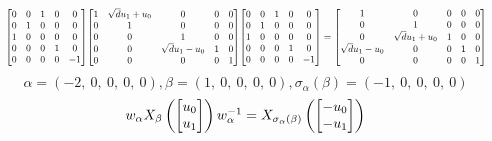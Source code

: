 \documentclass[11pt]{article}
\theoremstyle{definition}
\begin{document}
\[
\scaletoalign{\textwidth}{{\left[\begin{matrix}0 & 0 & 1 & 0 & 0\\0 & 1 & 0 & 0 & 0\\1 & 0 & 0 & 0 & 0\\0 & 0 & 0 & 1 & 0\\0 & 0 & 0 & 0 & -1\end{matrix}\right]} {\left[\begin{matrix}1 & \sqrt{d} u_{1} + u_{0} & 0 & 0 & 0\\0 & 1 & 0 & 0 & 0\\0 & 0 & 1 & 0 & 0\\0 & 0 & \sqrt{d} u_{1} - u_{0} & 1 & 0\\0 & 0 & 0 & 0 & 1\end{matrix}\right]} {\left[\begin{matrix}0 & 0 & 1 & 0 & 0\\0 & 1 & 0 & 0 & 0\\1 & 0 & 0 & 0 & 0\\0 & 0 & 0 & 1 & 0\\0 & 0 & 0 & 0 & -1\end{matrix}\right]} = {\left[\begin{matrix}1 & 0 & 0 & 0 & 0\\0 & 1 & 0 & 0 & 0\\0 & \sqrt{d} u_{1} + u_{0} & 1 & 0 & 0\\\sqrt{d} u_{1} - u_{0} & 0 & 0 & 1 & 0\\0 & 0 & 0 & 0 & 1\end{matrix}\right]}}
\]
\[
\alpha = \left( -2, \  0, \  0, \  0, \  0\right), \beta = \left( 1, \  0, \  0, \  0, \  0\right), \sigma_{\alpha}(\beta) = \left( -1, \  0, \  0, \  0, \  0\right)
\]
\[
\scaletoalign{\textwidth}{w_{\alpha} X_{\beta}\left(\left[\begin{matrix}u_{0}\\u_{1}\end{matrix}\right]\right) w_{\alpha}^{-1} = X_{\sigma_{\alpha}\left(\beta\right)}\left(\left[\begin{matrix}- u_{0}\\- u_{1}\end{matrix}\right]\right)}
\]
\end{document}
